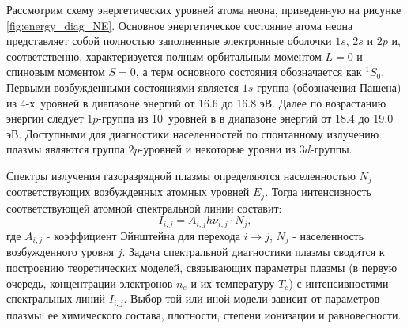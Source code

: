 Рассмотрим схему энергетических уровней атома неона, приведенную на
рисунке \ref{fig:energy_diag_NE}. Основное энергетическое состояние атома неона представляет собой
полностью заполненные электронные оболочки $1s$, $2s$ и $2p$ и, соответственно,
характеризуется полным орбитальным моментом $L = 0$ и спиновым моментом $S = 0$, а
терм основного состояния обозначается как $^1S_0$. Первыми возбужденными
состояниями является $1s$-группа (обозначения Пашена) из 4-х~уровней в диапазоне
энергий от 16.6 до 16.8 эВ.
Далее по возрастанию энергии следует $1p$-группа из 10~уровней в в диапазоне
энергий от 18.4 до 19.0 эВ. Доступными для диагностики населенностей по спонтанному
излучению плазмы являются группа $2p$-уровней и некоторые уровни из $3d$-группы.

Спектры излучения газоразрядной плазмы определяются населенностью $N_j$ соответствующих возбужденных атомных уровней $E_j$.
Тогда интенсивность соответствующей атомной спектральной линии составит:
\begin{equation}
    I_{i,j} = A_{i,j}h\nu_{i,j}⋅N_j,
\end{equation}
где $A_{i,j}$  - коэффициент Эйнштейна для перехода $i → j$, $N_j$ - населенность возбужденного уровня $j$.
Задача спектральной диагностики плазмы сводится к построению теоретических моделей, связывающих
параметры плазмы (в первую очередь, концентрации электронов $n_e$ и их температуру $T_e$) с интенсивностями спектральных
линий $I_{i,j}$. Выбор той или иной модели зависит от параметров плазмы: ее химического состава, плотности,
степени ионизации и равновесности.

